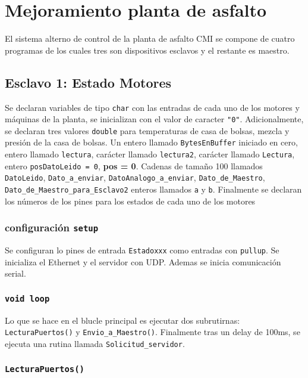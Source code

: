 \chapter{Mejoramiento planta de asfalto}

El sistema alterno de control de la planta de asfalto CMI se compone de cuatro programas de los cuales tres son dispositivos esclavos y el restante es maestro.

\section{Esclavo 1: Estado Motores}

Se declaran variables de tipo \texttt{char} con las entradas de cada uno de los motores y máquinas de la planta, se inicializan con el valor de caracter \texttt{"0"}. Adicionalmente, se declaran tres valores \texttt{double} para temperaturas de casa de bolsas, mezcla y presión de la casa de bolsas. Un entero llamado \texttt{BytesEnBuffer} iniciado en cero, entero llamado  \texttt{lectura}, carácter llamado \texttt{lectura2}, carácter llamado \texttt{Lectura}, entero \texttt{posDatoLeido = 0}, \textbf{pos = 0}. Cadenas de tamaño 100 llamados \texttt{DatoLeido}, \texttt{Dato\_a\_enviar}, \texttt{DatoAnalogo\_a\_enviar}, \texttt{Dato\_de\_Maestro}, \texttt{Dato\_de\_Maestro\_para\_Esclavo2}  enteros llamados \texttt{a} y \texttt{b}. Finalmente se declaran los números de los pines para los estados de cada uno de los motores

\subsection{configuración \texttt{setup}}


Se configuran lo pines de entrada \texttt{Estadoxxx} como entradas con \texttt{pullup}. Se inicializa el Ethernet y el servidor con UDP. Ademas se inicia comunicación serial.

\subsection{\texttt{void loop}}

Lo que se hace en el blucle principal es ejecutar dos subrutirnas: \texttt{LecturaPuertos()} y \texttt{Envio\_a\_Maestro()}. Finalmente tras un delay de 100ms, se ejecuta una rutina llamada \texttt{Solicitud\_servidor}.


\subsection{\texttt{LecturaPuertos()}}

